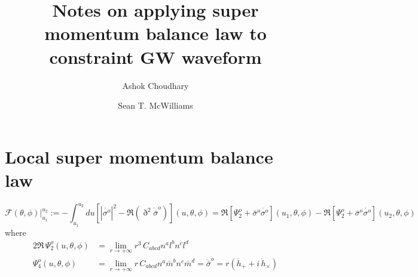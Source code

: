 \documentclass[prd,preprintnumbers,onecolumn,eqsecnum,floatfix,letter]{revtex4}
\begin{document}
\newcommand{\be}{\begin{equation}}
\newcommand{\ee}{\end{equation}}
\newcommand{\ber}{\begin{eqnarray}}
\newcommand{\eer}{\end{eqnarray}}
\def\bea{\begin{eqnarray}}
\def\eea{\end{eqnarray}}
\newcommand{\etal}{\emph{et al.}}


\title{Notes on applying super momentum balance law to constraint GW waveform }
\author{Ashok Choudhary}
\author{Sean T. McWilliams}

\begin{abstract}
\end{abstract}

\maketitle

\section{Local super momentum balance law}


\begin{equation}
\mathcal{F}(\theta,\phi) \Big|^{u_{2}}_{u_{1}}  := -\int_{u_{1}}^{u_{2}} du \left[|\dot{\sigma^{o}}|^{2} - \Re\left(\eth^{2}\dot{\bar{\sigma}}^{o} \right) \right](u, \theta, \phi) = \Re\left[\Psi^{o}_{2} + \bar{\sigma}^{o}\dot{\sigma^{o}}\right]\left(u_{1}, \theta, \phi\right) - \Re\left[\Psi^{o}_{2} + \bar{\sigma}^{o}\dot{\sigma^{o}}\right]\left(u_{2}, \theta, \phi\right) 
\end{equation}
where
\begin{align}
	2 \Re\, \Psi^{o}_{2}\left(u, \theta, \phi \right) & = \lim_{r \to +\infty} r^{3} \, C_{abcd}n^{a}l^{b}n^{c}l^{d}\label{psi2}\\  \Psi^{o}_{4}\left(u, \theta, \phi \right) & = \lim_{r \to +\infty} r \, C_{abcd}n^{a}\bar{m}^{b}n^{c} \bar{m}^{d} = \ddot{\bar{\sigma}}^{o} = r\left(\ddot{h}_{+} + i\, \ddot{h}_{\times}  \right)
	\label{psi4}
\end{align}
\end{document}
